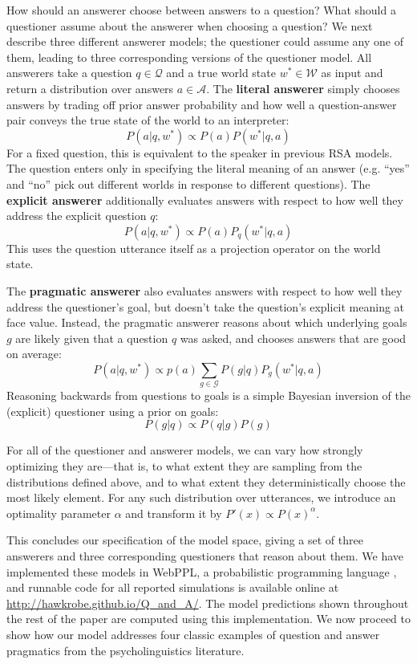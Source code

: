 \documentclass[12pt, floatsintext, jou]{apa6}
\begin{document}
How should an answerer choose between answers to a question? What should a questioner assume about the answerer when choosing a question? We next describe three different answerer models; the questioner could assume any one of them, leading to three corresponding versions of the questioner model.
All answerers take a question $q \in \mathcal{Q}$ and a true world state $w^* \in \mathcal{W}$ as input and return a distribution over answers $a \in \mathcal{A}$.
%
The \textbf{literal answerer} simply chooses answers by trading off prior answer probability  and how well a question-answer pair conveys the true state of the world to an interpreter:
%
$$P(a | q,w^*) \propto P(a) P(w^* | q, a) $$
%
For a fixed question, this is equivalent to the speaker in previous RSA models. The question enters only in specifying the literal meaning of an answer (e.g. ``yes'' and ``no'' pick out different worlds in response to different questions).
%
The \textbf{explicit answerer} additionally evaluates answers with respect to how well they address the explicit question $q$:
%
$$P(a | q, w^*) \propto P(a) P_q(w^* | q, a) $$
This uses the question utterance itself as a projection operator on the world state.

The \textbf{pragmatic answerer} also evaluates answers with respect to how well they address the questioner's goal, but doesn't take the question's explicit meaning at face value. Instead, the pragmatic answerer reasons about which underlying goals $g$ are likely given that a question $q$ was asked, and chooses answers that are good on average:
%
$$
P(a | q, w^*) \propto p(a) \sum_{g \in \mathcal{G}} P(g|q) P_g(w^*|q, a)
$$
Reasoning backwards from questions to goals is a simple Bayesian inversion of the (explicit) questioner using a prior on goals:
$$
P(g|q) \propto P(q|g)P(g)
$$


For all of the questioner and answerer models, we can vary how strongly optimizing they are---that is, to what extent they are sampling from the distributions defined above, and to what extent they deterministically choose the most likely element. For any such distribution over utterances, we introduce an optimality parameter $\alpha$ and transform it by $ P'(x) \propto P(x)^{\alpha} $.
%

This concludes our specification of the model space, giving a set of three answerers and three corresponding questioners that reason about them. We have implemented these models in WebPPL, a probabilistic programming language \cite{GoodmanStuhlmuller14_DIPPL}, and runnable code for all reported simulations is available online at \url{http://hawkrobe.github.io/Q\_and\_A/}. The model predictions shown throughout the rest of the paper are computed using this implementation. We now proceed to show how our model addresses four classic examples of question and answer pragmatics from the psycholinguistics literature.
\end{document}
